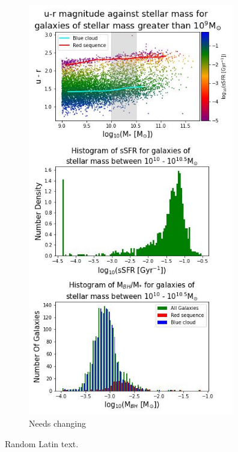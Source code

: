 \documentclass[12pt, onecolumn]{revtex4}    %
\begin{document}
\begin{figure}[H]
\centering
\includegraphics[width=9cm]{Plot_1.jpeg}
\caption{Needs changing}
\label{fig:1}
\end{figure}

\newpage

Random Latin text.
\end{document}
